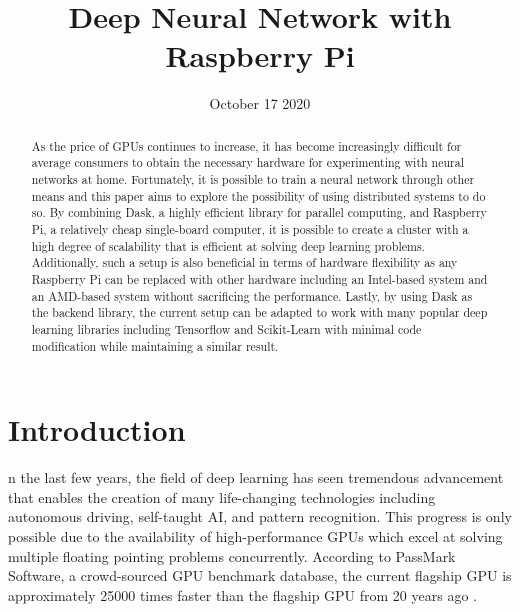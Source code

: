 \documentclass[conference]{IEEEtran}
\begin{document}
    \title{Deep Neural Network with Raspberry Pi}
    \author{
        \and
    }
    \date{October 17 2020}
    \maketitle

    \begin{abstract}
        As the price of GPUs continues to increase, it has become increasingly difficult for average consumers to obtain the necessary hardware for experimenting with neural networks at home. Fortunately, it is possible to train a neural network through other means and this paper aims to explore the possibility of using distributed systems to do so. By combining Dask, a highly efficient library for parallel computing, and Raspberry Pi, a relatively cheap single-board computer, it is possible to create a cluster with a high degree of scalability that is efficient at solving deep learning problems. Additionally, such a setup is also beneficial in terms of hardware flexibility as any Raspberry Pi can be replaced with other hardware including an Intel-based system and an AMD-based system without sacrificing the performance. Lastly, by using Dask as the backend library, the current setup can be adapted to work with many popular deep learning libraries including Tensorflow and Scikit-Learn with minimal code modification while maintaining a similar result.
        \end{abstract}

    \section{Introduction}
        n the last few years, the field of deep learning has seen tremendous advancement that enables the creation of many life-changing technologies including autonomous driving, self-taught AI, and pattern recognition. This progress is only possible due to the availability of high-performance GPUs which excel at solving multiple floating pointing problems concurrently.
        According to PassMark Software, a crowd-sourced GPU benchmark database, the current flagship GPU is approximately 25000 times faster than the flagship GPU from 20 years ago \cite{passmark_software}. 
\end{document}
